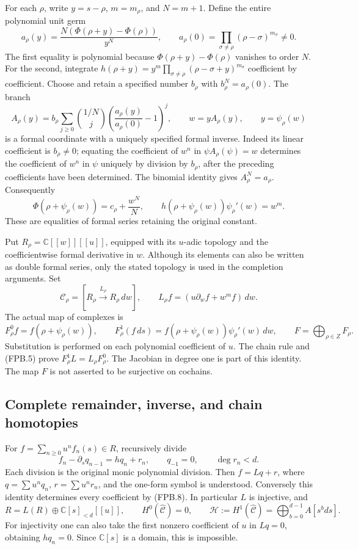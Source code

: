 For each \(\rho\), write \(y=s-\rho\), \(m=m_\rho\), and \(N=m+1\).
Define the entire polynomial unit germ
\[
 a_\rho(y)=\frac{N(\Phi(\rho+y)-\Phi(\rho))}{y^N},
 \qquad
 a_\rho(0)=\prod_{\sigma\ne\rho}(\rho-\sigma)^{m_\sigma}\ne0.
 \tag{FPB.3}\label{eq:fpb-a}
\]
The first equality is polynomial because \(\Phi(\rho+y)-\Phi(\rho)\)
vanishes to order \(N\). For the second, integrate
\(h(\rho+y)=y^m\prod_{\sigma\ne\rho}(\rho-\sigma+y)^{m_\sigma}\)
coefficient by coefficient. Choose and retain a specified number
\(b_\rho\) with \(b_\rho^N=a_\rho(0)\). The branch
\[
 A_\rho(y)=b_\rho
 \sum_{j\ge0}\binom{1/N}{j}
       \left(\frac{a_\rho(y)}{a_\rho(0)}-1\right)^j,
 \qquad w=yA_\rho(y),\qquad y=\psi_\rho(w)
 \tag{FPB.4}\label{eq:fpb-coordinate}
\]
is a formal coordinate with a uniquely specified formal inverse.
Indeed its linear coefficient is \(b_\rho\ne0\); equating the
coefficient of \(w^n\) in \(\psi A_\rho(\psi)=w\) determines the
coefficient of \(w^n\) in \(\psi\) uniquely by division by
\(b_\rho\), after the preceding coefficients have been determined.
The binomial identity gives \(A_\rho^N=a_\rho\). Consequently
\[
 \Phi(\rho+\psi_\rho(w))=c_\rho+\frac{w^N}{N},
 \qquad h(\rho+\psi_\rho(w))\psi_\rho'(w)=w^m.
 \tag{FPB.5}\label{eq:fpb-phase}
\]
These are equalities of formal series retaining the original constant.

Put \(R_\rho=\mathbb C[[w]][[u]]\), equipped with its \(u\)-adic
topology and the coefficientwise formal derivative in \(w\). Although
its elements can also be written as double formal series, only the
stated topology is used in the completion arguments. Set
\[
 \mathcal C_\rho=[R_\rho\xrightarrow{L_\rho}R_\rho\,dw],
 \qquad L_\rho f=(u\partial_w f+w^m f)\,dw.
 \tag{FPB.6}\label{eq:fpb-local-complex}
\]
The actual map of complexes is
\[
 F^0_\rho f=f(\rho+\psi_\rho(w)),\qquad
 F^1_\rho(f\,ds)=f(\rho+\psi_\rho(w))\psi_\rho'(w)\,dw,
 \qquad F=\bigoplus_{\rho\in Z}F_\rho.
 \tag{FPB.7}\label{eq:fpb-chain-map}
\]
Substitution is performed on each polynomial coefficient of \(u\).
The chain rule and (FPB.5) prove \(F^1_\rho L=L_\rho F^0_\rho\).
The Jacobian in degree one is part of this identity. The map \(F\)
is not asserted to be surjective on cochains.

\subsection{Complete remainder, inverse, and chain homotopies}

For \(f=\sum_{n\ge0}u^nf_n(s)\in R\), recursively divide
\[
 f_n-\partial_s q_{n-1}=h q_n+r_n,
 \qquad q_{-1}=0,\qquad \deg r_n<d.
 \tag{FPB.8}\label{eq:fpb-global-division}
\]
Each division is the original monic polynomial division. Then
\(f=Lq+r\), where \(q=\sum u^nq_n\), \(r=\sum u^nr_n\), and the
one-form symbol is understood. Conversely this identity determines
every coefficient by (FPB.8). In particular \(L\) is injective, and
\[
 R=L(R)\oplus\mathbb C[s]_{<d}[[u]],\qquad
 H^0(\widehat{\mathcal C})=0,\qquad
 \mathcal H:=H^1(\widehat{\mathcal C})
       =\bigoplus_{b=0}^{d-1}A[s^bds].
 \tag{FPB.9}\label{eq:fpb-global-remainder}
\]
For injectivity one can also take the first nonzero coefficient of
\(u\) in \(Lq=0\), obtaining \(h q_n=0\). Since
\(\mathbb C[s]\) is a domain, this is impossible.


